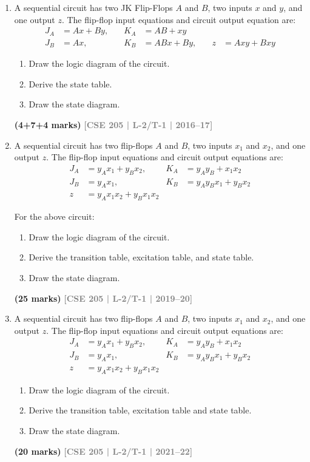 \documentclass[12pt,a4paper]{article}
\newcommand{\yr}[1]{\hfill\textcolor{gray}{\small\textbf{[#1]}}}
\newcommand{\mk}[1]{\textcolor{orange!70!black}{\small\textbf{(#1 marks)}}}
\begin{document}
\begin{enumerate}
\item A sequential circuit has two JK Flip-Flops $A$ and $B$, two inputs $x$ and $y$, and one output $z$. The flip-flop input equations and circuit output equation are:
\begin{align*}
  J_A &= Ax + By,\quad & K_A &= AB + xy \\
  J_B &= Ax,\quad & K_B &= ABx + By,\quad & z &= Axy + Bxy
\end{align*}
\begin{enumerate}
  \item Draw the logic diagram of the circuit.
  \item Derive the state table.
  \item Draw the state diagram.
  \end{enumerate}
\mk{4+7+4} \yr{CSE 205 | L-2/T-1 | 2016--17}

\item A sequential circuit has two flip-flops $A$ and $B$, two inputs $x_1$ and $x_2$, and one output $z$. The flip-flop input equations and circuit output equations are:
\begin{align*}
  J_A &= y_A x_1 + y_B x_2,\quad  & K_A &= y_A y_B + x_1 x_2 \\
  J_B &= y_A x_1,\quad             & K_B &= y_A y_B x_1 + y_B x_2 \\
  z   &= y_A x_1 x_2 + y_B x_1 x_2
\end{align*}

For the above circuit:
\begin{enumerate}
  \item Draw the logic diagram of the circuit.
  \item Derive the transition table, excitation table, and state table.
  \item Draw the state diagram.
\end{enumerate}
\mk{25} \yr{CSE 205 | L-2/T-1 | 2019--20}

\item A sequential circuit has two flip-flops $A$ and $B$, two inputs $x_1$ and $x_2$, and one output $z$. The flip-flop input equations and circuit output equations are:
\begin{align*}
  J_A &= y_A x_1 + y_B x_2,\quad  & K_A &= y_A y_B + x_1 x_2 \\
  J_B &= y_A x_1,\quad             & K_B &= y_A y_B x_1 + y_B x_2 \\
  z   &= y_A x_1 x_2 + y_B x_1 x_2
\end{align*}
\begin{enumerate}
  \item Draw the logic diagram of the circuit.
  \item Derive the transition table, excitation table and state table.
  \item Draw the state diagram.
\end{enumerate}
\mk{20} \yr{CSE 205 | L-2/T-1 | 2021--22}


\end{enumerate}
\end{document}
